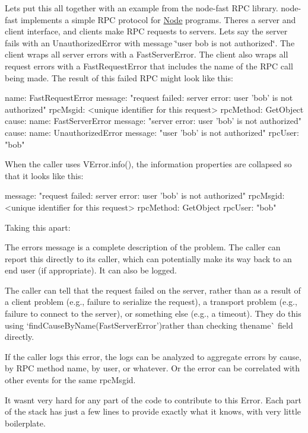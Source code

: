 Let\textquotesingle{}s put this all together with an example from the node-\/fast R\+PC library. node-\/fast implements a simple R\+PC protocol for \mbox{\hyperlink{classNode}{Node}} programs. There\textquotesingle{}s a server and client interface, and clients make R\+PC requests to servers. Let\textquotesingle{}s say the server fails with an Unauthorized\+Error with message \char`\"{}user \textquotesingle{}bob\textquotesingle{} is not
authorized\char`\"{}. The client wraps all server errors with a Fast\+Server\+Error. The client also wraps all request errors with a Fast\+Request\+Error that includes the name of the R\+PC call being made. The result of this failed R\+PC might look like this\+: \begin{DoxyVerb}name: FastRequestError
message: "request failed: server error: user 'bob' is not authorized"
rpcMsgid: <unique identifier for this request>
rpcMethod: GetObject
cause:
    name: FastServerError
    message: "server error: user 'bob' is not authorized"
    cause:
        name: UnauthorizedError
        message: "user 'bob' is not authorized"
        rpcUser: "bob"
\end{DoxyVerb}


When the caller uses {\ttfamily V\+Error.\+info()}, the information properties are collapsed so that it looks like this\+: \begin{DoxyVerb}message: "request failed: server error: user 'bob' is not authorized"
rpcMsgid: <unique identifier for this request>
rpcMethod: GetObject
rpcUser: "bob"
\end{DoxyVerb}


Taking this apart\+:


\begin{DoxyItemize}
\item The error\textquotesingle{}s message is a complete description of the problem. The caller can report this directly to its caller, which can potentially make its way back to an end user (if appropriate). It can also be logged.
\item The caller can tell that the request failed on the server, rather than as a result of a client problem (e.\+g., failure to serialize the request), a transport problem (e.\+g., failure to connect to the server), or something else (e.\+g., a timeout). They do this using `find\+Cause\+By\+Name(\textquotesingle{}Fast\+Server\+Error'){\ttfamily  rather than checking the}name\`{} field directly.
\item If the caller logs this error, the logs can be analyzed to aggregate errors by cause, by R\+PC method name, by user, or whatever. Or the error can be correlated with other events for the same rpc\+Msgid.
\item It wasn\textquotesingle{}t very hard for any part of the code to contribute to this Error. Each part of the stack has just a few lines to provide exactly what it knows, with very little boilerplate.
\end{DoxyItemize}

